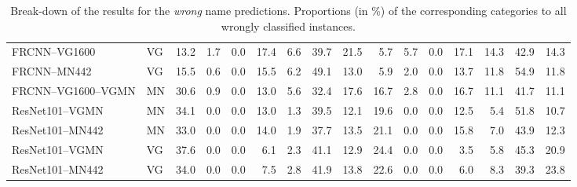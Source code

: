 \begin{table}[t]
\begin{tabular}{ll|r@{~}|r@{~}r@{~}r@{~}r@{~}|r@{~}r@{~}||r@{~}|r@{~}r@{~}r@{~}r@{~}|r@{~}r@{~}}
		\midrule
		FRCNN--VG1600 & VG     &                 13.2 &             1.7 &                 0.0 &                  17.4 &            6.6 &           39.7 &             21.5 &                  5.7 &             5.7 &                 0.0 &                  17.1 &           14.3 &           42.9 &             14.3 \\
		FRCNN--MN442 & VG       &                 15.5 &             0.6 &                 0.0 &                  15.5 &            6.2 &           49.1 &             13.0 &                  5.9 &             2.0 &                 0.0 &                  13.7 &           11.8 &           54.9 &             11.8 \\
		\midrule \midrule
		FRCNN--VG1600--VGMN & MN &                 30.6 &             0.9 &                 0.0 &                  13.0 &            5.6 &           32.4 &             17.6 &                 16.7 &             2.8 &                 0.0 &                  16.7 &           11.1 &           41.7 &             11.1 \\
		\midrule
		ResNet101--VGMN & MN	&                 34.1 &             0.0 &                 0.0 &                  13.0 &            1.3 &           39.5 &             12.1 &                 19.6 &             0.0 &                 0.0 &                  12.5 &            5.4 &           51.8 &             10.7 \\
		ResNet101--MN442 & MN  &                 33.0 &             0.0 &                 0.0 &                  14.0 &            1.9 &           37.7 &             13.5 &                 21.1 &             0.0 &                 0.0 &                  15.8 &            7.0 &           43.9 &             12.3 \\
		ResNet101--VGMN & VG  &                 37.6 &             0.0 &                 0.0 &                   6.1 &            2.3 &           41.1 &             12.9 &                 24.4 &             0.0 &                 0.0 &                   3.5 &            5.8 &           45.3 &             20.9 \\
		ResNet101--MN442 & VG &                 34.0 &             0.0 &                 0.0 &                   7.5 &            2.8 &           41.9 &             13.8 &                 22.6 &             0.0 &                 0.0 &                   6.0 &            8.3 &           39.3 &             23.8 \\
		\bottomrule
	\end{tabular}
	\caption{Break-down of the results for the \textit{wrong} name predictions. Proportions (in \%) of the corresponding categories to all wrongly classified instances.  \label{tab:exp_details_wrong}}
\end{table}

